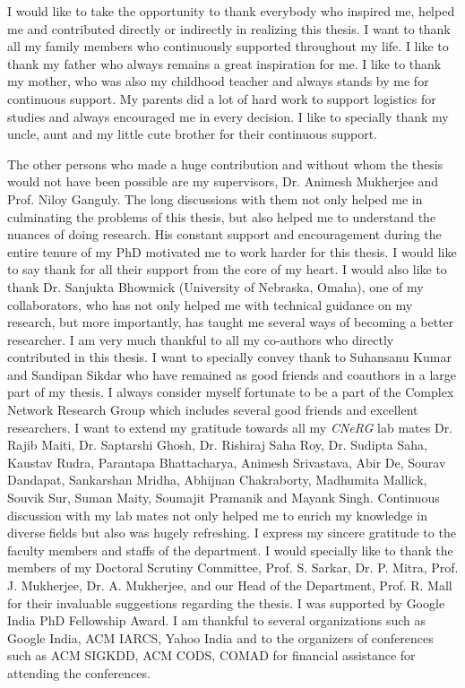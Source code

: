 
\noindent
I would like to take the opportunity to thank everybody who inspired me, helped me and contributed directly or indirectly in realizing this
thesis. I want to thank all my family members who continuously supported throughout my life. I like to thank my father who always remains a
great inspiration for me. I like to thank my mother, who was also my childhood teacher and always stands by me for continuous support. My
parents did a lot of hard work to support logistics for studies and always encouraged me in every decision. I like to specially thank my
uncle, aunt and my little cute brother for their continuous support.  

The other persons who made a huge contribution and without whom the thesis would not have been possible are my supervisors, Dr.
Animesh Mukherjee and Prof. Niloy Ganguly. The long discussions with them not only helped me in culminating the problems of this thesis, but
also helped me to understand the nuances of doing research. His constant support and encouragement during the entire tenure of my PhD
motivated me to work harder for this thesis. I would like to say thank for all their support from the core of my heart. I would also like
to thank Dr. Sanjukta Bhowmick (University of Nebraska, Omaha), one of my collaborators, who has not only helped me with technical guidance
on my research, but more importantly, has taught me several ways of becoming a better researcher. I am very
much thankful to all my co-authors who directly contributed in this thesis. I want to specially convey thank to Suhansanu Kumar and
Sandipan Sikdar who have
remained as good friends and coauthors in a large part of my thesis. I always consider myself fortunate to be a part of the Complex Network
Research Group which
includes several good friends and excellent researchers. I want to extend my gratitude towards all my {\em CNeRG} lab mates Dr. Rajib Maiti,
Dr. Saptarshi Ghosh, Dr. Rishiraj Saha Roy, Dr. Sudipta Saha, Kaustav Rudra, Parantapa Bhattacharya, Animesh Srivastava, Abir De, Sourav
Dandapat, Sankarshan
Mridha, Abhijnan Chakraborty, Madhumita Mallick, Souvik Sur, Suman Maity, Soumajit
Pramanik and Mayank Singh. Continuous discussion with my lab mates not only helped me to enrich my knowledge in diverse fields but also was
hugely refreshing.  I express my sincere gratitude to the faculty
members and staffs of the department. I would specially like to thank the members of my Doctoral Scrutiny Committee,  Prof. S. Sarkar, Dr.
P. Mitra, Prof. J. Mukherjee, Dr. A. Mukherjee, and our Head of the Department, Prof. R. Mall for their invaluable suggestions regarding the
thesis. I was supported by Google India PhD Fellowship Award. I am thankful to several organizations such as Google India, ACM IARCS, Yahoo
India and to the organizers of conferences such as ACM SIGKDD, ACM CODS, COMAD for financial assistance for attending the
conferences.


